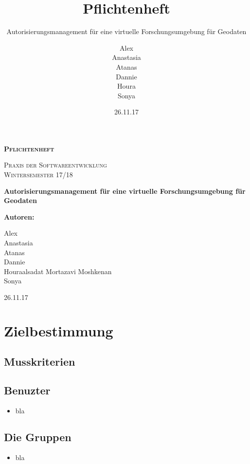 \documentclass[parskip=full,11pt]{scrartcl}
\title{Pflichtenheft}
\subtitle{Autorisierungsmanagement für eine virtuelle Forschungsumgebung für Geodaten}
\author{Alex\\Anastasia\\Atanas\\Dannie\\ Houra\\Sonya\\}
\date{26.11.17}
\begin{document}
\begin{titlepage}
	
	\begin{center}
	{\scshape\LARGE\bfseries Pflichtenheft \par}
	\vspace{1cm}
	{\scshape\Large Praxis der Softwareentwicklung\\}
	\vspace{1cm}
	{\scshape\Large Wintersemester 17/18\\}
	\vspace{3cm}
	{\huge\bfseries Autorisierungsmanagement für eine virtuelle Forschungsumgebung für Geodaten\par}
	\vspace{2cm}
	\vfill
	{\bfseries {\Large Autoren}:\par}
	{\Large Alex}\\%
	{\Large Anastasia}\\%
	{\Large Atanas}\\%
	{\Large Dannie}\\%
	{\Large Houraalsadat Mortazavi Moshkenan}\\
	{\Large Sonya}\\%
	\vfill
	{\large 26.11.17 \par}
	\end{center}
\end{titlepage}
\tableofcontents

\newpage
\section{Zielbestimmung}

\subsection{Musskriterien}
\subsection*{Benuzter}
\begin{itemize}[itemsep=0pt]
 \item bla
\end{itemize}

\subsection*{Die Gruppen}
\begin{itemize}[itemsep=0pt]
 \item bla
\end{itemize}
\end{document}
